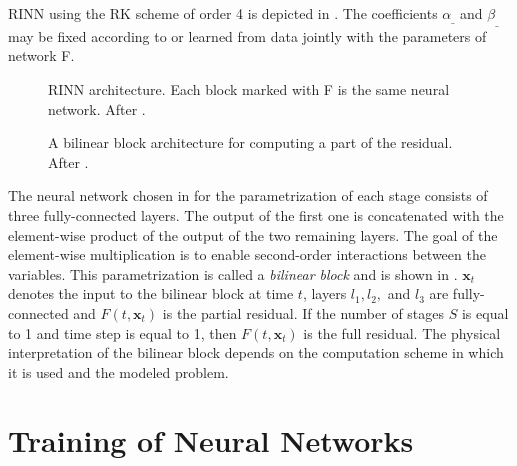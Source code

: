 \Ac{RINN} using the \ac{RK} scheme of order 4 is depicted in . The coefficients $\alpha_{\_}$ and $\beta_{\_}$ may be fixed according to  or learned from data jointly with the parameters of network F.

\begin{figure}
  \centering
  \scalebox{0.83}{}
  \caption{\Acl{RINN} architecture. Each block marked with F is the same neural network. After \cite{Fablet2017}.}
  \label{fig:rinn4}
\end{figure}

\begin{figure}
  \centering
  \scalebox{0.7}{}
  \caption{A bilinear block architecture for computing a part of the residual. After \cite{Fablet2017}.}
  \label{fig:bilinear_block}
\end{figure}

The neural network chosen in \cite{Ouala2019}
for the parametrization of each stage consists of three fully-connected layers. The output of the first one is concatenated with the element-wise product of the output of the two remaining layers. The goal of the element-wise multiplication is to enable second-order interactions between the variables. This parametrization is called a \emph{bilinear block} \cite{Fablet2017} and is shown in . $\pmb{x}_t$ denotes the input to the bilinear block at time $t$, layers $l_1, l_2,$ and $l_3$ are fully-connected and $F(t, \pmb{x}_t)$ is the partial residual. If the number of stages $S$ is equal to 1 and time step is equal to 1, then $F(t, \pmb{x}_t)$ is the full residual. The physical interpretation of the bilinear block depends on the computation scheme in which it is used and the modeled problem.



\section*{Training of Neural Networks}

